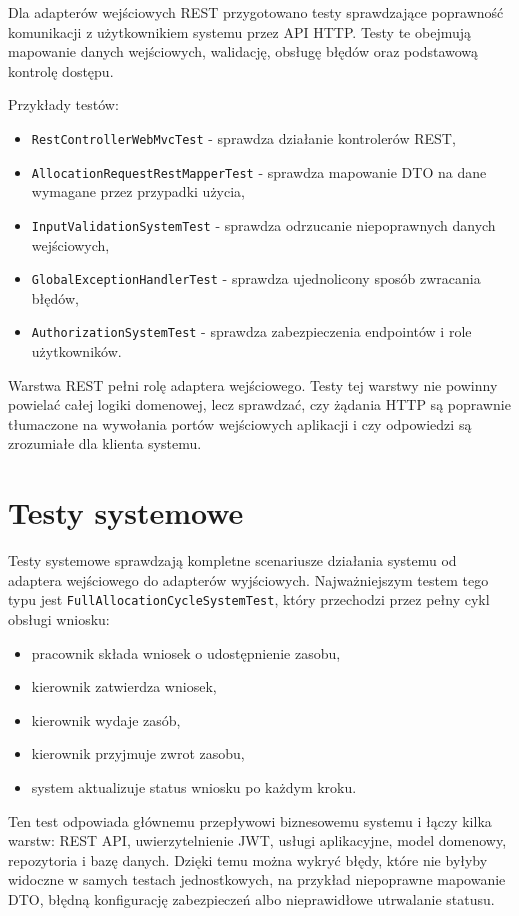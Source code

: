 Dla adapterów wejściowych REST przygotowano testy sprawdzające poprawność komunikacji z użytkownikiem systemu przez API HTTP. Testy te obejmują mapowanie danych wejściowych, walidację, obsługę błędów oraz podstawową kontrolę dostępu.

Przykłady testów:
\begin{itemize}
    \item \texttt{RestControllerWebMvcTest} - sprawdza działanie kontrolerów REST,
    \item \texttt{AllocationRequestRestMapperTest} - sprawdza mapowanie DTO na dane wymagane przez przypadki użycia,
    \item \texttt{InputValidationSystemTest} - sprawdza odrzucanie niepoprawnych danych wejściowych,
    \item \texttt{GlobalExceptionHandlerTest} - sprawdza ujednolicony sposób zwracania błędów,
    \item \texttt{AuthorizationSystemTest} - sprawdza zabezpieczenia endpointów i role użytkowników.
\end{itemize}

Warstwa REST pełni rolę adaptera wejściowego. Testy tej warstwy nie powinny powielać całej logiki domenowej, lecz sprawdzać, czy żądania HTTP są poprawnie tłumaczone na wywołania portów wejściowych aplikacji i czy odpowiedzi są zrozumiałe dla klienta systemu.


\section{Testy systemowe}

Testy systemowe sprawdzają kompletne scenariusze działania systemu od adaptera wejściowego do adapterów wyjściowych. Najważniejszym testem tego typu jest \texttt{FullAllocationCycleSystemTest}, który przechodzi przez pełny cykl obsługi wniosku:
\begin{itemize}
    \item pracownik składa wniosek o udostępnienie zasobu,
    \item kierownik zatwierdza wniosek,
    \item kierownik wydaje zasób,
    \item kierownik przyjmuje zwrot zasobu,
    \item system aktualizuje status wniosku po każdym kroku.
\end{itemize}

Ten test odpowiada głównemu przepływowi biznesowemu systemu i łączy kilka warstw: REST API, uwierzytelnienie JWT, usługi aplikacyjne, model domenowy, repozytoria i bazę danych. Dzięki temu można wykryć błędy, które nie byłyby widoczne w samych testach jednostkowych, na przykład niepoprawne mapowanie DTO, błędną konfigurację zabezpieczeń albo nieprawidłowe utrwalanie statusu.

